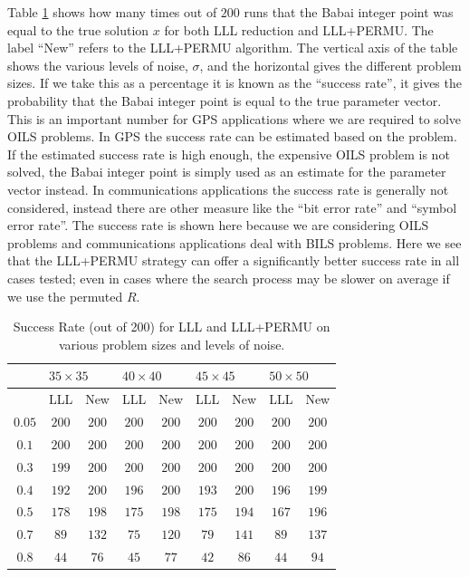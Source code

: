 \documentclass[12pt,Bold,letterpaper]{mcgilletdclass}
\begin{document}
Table \ref{tab:successRates} shows how many times out of $200$ runs that the
Babai integer point was equal to the true solution $x$ for both LLL reduction and
LLL+PERMU. The label ``New'' refers to the LLL+PERMU algorithm. The vertical axis of the table shows the various levels of noise,
$\sigma$, and the horizontal gives the different problem sizes. If we take this
as a percentage it is known as the ``success rate'', it gives the probability that the Babai integer point is equal to the true parameter vector. This is an important number for GPS applications where we are required to solve OILS problems. In GPS the success rate can be estimated based on the problem. If the estimated success rate is high enough, the expensive OILS problem is not solved, the Babai integer point is simply used as an estimate for the parameter vector instead. In communications applications the success rate is generally not considered, instead there are other measure like the ``bit error rate'' and ``symbol error rate''. The success rate is shown here because we are considering OILS problems and communications applications deal with BILS problems. Here we see that the LLL+PERMU strategy can offer a significantly better success rate in all cases tested; even in cases where the search process may be slower on average if we use the permuted $R$.

\begin{table}
\caption{Success Rate (out of 200) for LLL and LLL+PERMU on various problem
sizes and levels of noise.}
\label{tab:successRates}
\begin{tabular}{|c|c|c|c|c|c|c|c|c|}
\hline
&               \multicolumn{2}{|l|}{$35 \times 35$} & \multicolumn{2}{|l|}{$40
\times 40$} &\multicolumn{2}{|l|}{$45 \times 45$} & \multicolumn{2}{|l|}{$50
\times 50$} \\ \hline
&               LLL & New & LLL & New & LLL & New & LLL &
New \\ \hline
$0.05$&         $200$ & $200$ & $200$ & $200$ & $200$ & $200$ & $200$ & $200$ 
\\ \hline        
$0.1$&           $200$ & $200$ & $200$ & $200$ & $200$ & $200$ & $200$ & $200$
\\ \hline
$0.3$&           $199$ & $200$ & $200$ & $200$ & $200$ & $200$ & $200$ & $200$
\\ \hline
$0.4$&           $192$ & $200$ & $196$ & $200$ & $193$ & $200$ & $196$ & $199$
\\ \hline
$0.5$&           $178$ & $198$ & $175$ & $198$ & $175$ & $194$ & $167$ & $196$
\\ \hline
$0.7$&            $89$ & $132$ &  $75$ & $120$ & $79$  & $141$ & $89$  & $137$
\\ \hline
$0.8$&            $44$ &  $76$ &  $45$ &  $77$ & $42$  & $86$  & $44$  & $94$
\\ 
\hline
\end{tabular}
\end{table}
\end{document}
